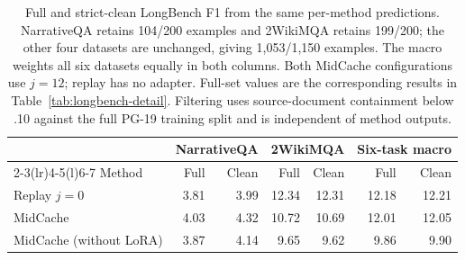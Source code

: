 \begin{table}[htbp]
\centering
\small
\setlength{\tabcolsep}{5pt}
\begin{tabular}{@{}lrrrrrr@{}}
\toprule
& \multicolumn{2}{c}{NarrativeQA} & \multicolumn{2}{c}{2WikiMQA} & \multicolumn{2}{c}{Six-task macro} \\
\cmidrule(lr){2-3}\cmidrule(lr){4-5}\cmidrule(l){6-7}
Method & Full & Clean & Full & Clean & Full & Clean \\
\midrule
Replay $j=0$ & 3.81 & 3.99 & 12.34 & 12.31 & 12.18 & 12.21 \\
MidCache & 4.03 & 4.32 & 10.72 & 10.69 & 12.01 & 12.05 \\
MidCache (without LoRA) & 3.87 & 4.14 & 9.65 & 9.62 & 9.86 & 9.90 \\
\bottomrule
\end{tabular}
\caption{Full and strict-clean LongBench F1 from the same per-method predictions. NarrativeQA retains 104/200 examples and 2WikiMQA retains 199/200; the other four datasets are unchanged, giving 1,053/1,150 examples. The macro weights all six datasets equally in both columns. Both MidCache configurations use $j=12$; replay has no adapter. Full-set values are the corresponding results in Table~\ref{tab:longbench-detail}. Filtering uses source-document containment below .10 against the full PG-19 training split and is independent of method outputs.}
\label{tab:clean-longbench}
\end{table}
